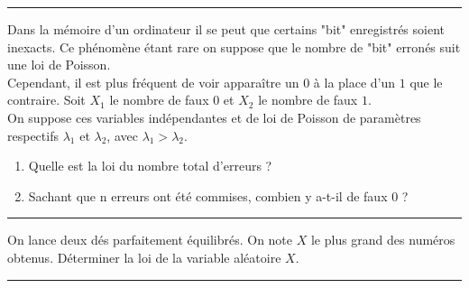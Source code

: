 \documentclass[../PolyS4.tex]{subfiles}
\begin{document}
\hfill\break
\hrule
\hfill\break



Dans la mémoire d'un ordinateur il se peut que certains "bit" enregistrés soient inexacts.
Ce phénomène étant rare on suppose que le nombre de "bit" erronés suit une loi de Poisson.\\ Cependant, il est plus fréquent de voir apparaître un $0$ à la place d'un $1$ que le contraire. Soit $X_1$ le nombre de faux $0$ et $X_2$ le nombre de faux $1$.\\
 On suppose ces variables indépendantes et de loi de Poisson de paramètres respectifs $\lambda_1$ et $\lambda_2$, avec $\lambda_1 > \lambda_2$.
\begin{enumerate}
\item Quelle est la loi du nombre total d'erreurs ?
\item Sachant que n erreurs ont été commises, combien y a-t-il de faux $0$ ?\\
\end{enumerate}

\hfill\break
\hrule
\hfill\break



On lance deux dés parfaitement équilibrés. On note $X$ le plus grand des numéros obtenus. Déterminer la loi de la variable aléatoire $X$.\\

\hfill\break
\hrule
\hfill\break

\newpage

\end{document}
